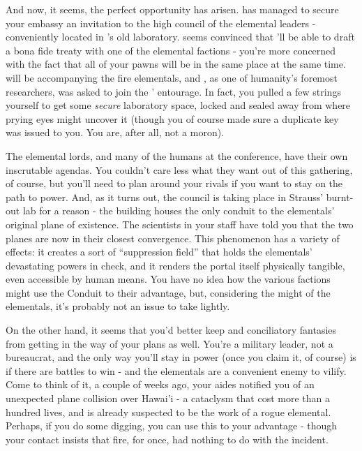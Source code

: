 \documentclass[char]{elementals}
\begin{document}
And now, it seems, the perfect opportunity has arisen. \cLeader{} has managed to secure your embassy an invitation to the high council of the elemental leaders - conveniently located in \cGrandfather{}'s old laboratory. \cLeader{} seems convinced that \cLeader{\they}'ll be able to draft a bona fide treaty with one of the elemental factions - you're more concerned with the fact that all of your pawns will be in the same place at the same time. \cPyro{} will be accompanying the fire elementals, and \cMS{}, as one of humanity's foremost researchers, was asked to join the \cNewUN{}' entourage. In fact, you pulled a few strings yourself to get \cMS{\them} some \emph{secure} laboratory space, locked and sealed away from where prying eyes might uncover it (though you of course made sure a duplicate key was issued to you. You are, after all, not a moron). 

The elemental lords, and many of the humans at the conference, have their own inscrutable agendas. You couldn't care less what they want out of this gathering, of course, but you'll need to plan around your rivals if you want to stay on the path to power. And, as it turns out, the council is taking place in Strauss' burnt-out lab for a reason - the building houses the only conduit to the elementals' original plane of existence. The scientists in your staff have told you that the two planes are now in their closest convergence. This phenomenon has a variety of effects: it creates a sort of ``suppression field'' that holds the elementals' devastating powers in check, and it renders the portal itself physically tangible, even accessible by human means. You have no idea how the various factions might use the Conduit to their advantage, but, considering the might of the elementals, it's probably not an issue to take lightly.

On the other hand, it seems that you'd better keep \cLeader{} and \cLeader{\their} conciliatory fantasies from getting in the way of your plans as well. You're a military leader, not a bureaucrat, and the only way you'll stay in power (once you claim it, of course) is if there are battles to win - and the elementals are a convenient enemy to vilify. Come to think of it, a couple of weeks ago, your aides notified you of an unexpected plane collision over Hawai'i - a cataclysm that cost more than a hundred lives, and is already suspected to be the work of a rogue elemental. Perhaps, if you do some digging, you can use this to your advantage - though your contact \cPyro{} insists that fire, for once, had nothing to do with the incident.
\end{document}
